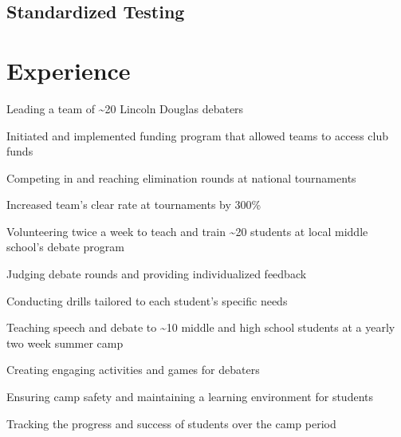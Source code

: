 \documentclass[letterpaper]{resume-shreeram}
\begin{document}
\subsection{Standardized Testing}



\section{Experience}

\begin{compactitem}
    \item Leading a team of \textasciitilde{}20 Lincoln Douglas debaters

    \item Initiated and implemented funding program that allowed teams
      to access club funds

    \item Competing in and reaching elimination rounds at national tournaments

    \item Increased team's clear rate at tournaments by 300\%
\end{compactitem}

\begin{compactitem}
    \item Volunteering twice a week to teach and train
      \textasciitilde{}20 students at local middle school's debate
      program

    \item Judging debate rounds and providing individualized feedback

    \item Conducting drills tailored to each student's specific needs
\end{compactitem}

\begin{compactitem}
    \item Teaching speech and debate to \textasciitilde{}10 middle and
      high school students at a yearly two week summer camp

    \item Creating engaging activities and games for debaters

    \item Ensuring camp safety and maintaining a learning environment
      for students

    \item Tracking the progress and success of students over the camp
      period
\end{compactitem}
\end{document}
